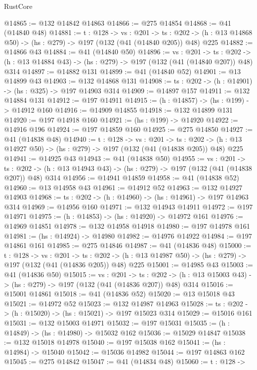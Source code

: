 \begin{lexlean}{RustCore}
\begin{coremodule}
@14865 := @132 @14842 @14863
@14866 := @275 @14854
@14868 := @41 (@14840 @48)
@14881 := {t : @128} ->
  {vs : @201} ->
  {ts : @202} -> (h : @13 @14868 @50) -> (hs : @279) -> @197 (@132 (@41 (@14840 @205)) @48) @225
@14882 := @14866 @43
@14884 := @41 (@14840 @50)
@14896 := {vs : @201} ->
  {ts : @202} -> (h : @13 @14884 @43) -> (hs : @279) -> @197 (@132 (@41 (@14840 @207)) @48) @314
@14897 := @14882 @131
@14899 := @41 (@14840 @52)
@14901 := @13 @14899 @43
@14903 := @132 @14868 @131
@14908 := {ts : @202} -> (h : @14901) -> (hs : @325) -> @197 @14903 @314
@14909 := @14897 @157
@14911 := @132 @14884 @131
@14912 := @197 @14911
@14915 := (h : @14857) -> (hs : @199) -> @14912 @160
@14916 := @14909 @14855
@14918 := @132 @14899 @131
@14920 := @197 @14918 @160
@14921 := (hs : @199) -> @14920
@14922 := @14916 @196
@14924 := @197 @14859 @160
@14925 := @275 @14850
@14927 := @41 (@14838 @48)
@14940 := {t : @128} ->
  {vs : @201} ->
  {ts : @202} -> (h : @13 @14927 @50) -> (hs : @279) -> @197 (@132 (@41 (@14838 @205)) @48) @225
@14941 := @14925 @43
@14943 := @41 (@14838 @50)
@14955 := {vs : @201} ->
  {ts : @202} -> (h : @13 @14943 @43) -> (hs : @279) -> @197 (@132 (@41 (@14838 @207)) @48) @314
@14956 := @14941 @14859
@14958 := @41 (@14838 @52)
@14960 := @13 @14958 @43
@14961 := @14912 @52
@14963 := @132 @14927 @14903
@14968 := {ts : @202} -> (h : @14960) -> (hs : @14961) -> @197 @14963 @314
@14969 := @14956 @160
@14971 := @132 @14943 @14911
@14972 := @197 @14971
@14975 := (h : @14853) -> (hs : @14920) -> @14972 @161
@14976 := @14969 @14851
@14978 := @132 @14958 @14918
@14980 := @197 @14978 @161
@14981 := (hs : @14924) -> @14980
@14982 := @14976 @14922
@14984 := @197 @14861 @161
@14985 := @275 @14846
@14987 := @41 (@14836 @48)
@15000 := {t : @128} ->
  {vs : @201} ->
  {ts : @202} -> (h : @13 @14987 @50) -> (hs : @279) -> @197 (@132 (@41 (@14836 @205)) @48) @225
@15001 := @14985 @43
@15003 := @41 (@14836 @50)
@15015 := {vs : @201} ->
  {ts : @202} -> (h : @13 @15003 @43) -> (hs : @279) -> @197 (@132 (@41 (@14836 @207)) @48) @314
@15016 := @15001 @14861
@15018 := @41 (@14836 @52)
@15020 := @13 @15018 @43
@15021 := @14972 @52
@15023 := @132 @14987 @14963
@15028 := {ts : @202} -> (h : @15020) -> (hs : @15021) -> @197 @15023 @314
@15029 := @15016 @161
@15031 := @132 @15003 @14971
@15032 := @197 @15031
@15035 := (h : @14849) -> (hs : @14980) -> @15032 @162
@15036 := @15029 @14847
@15038 := @132 @15018 @14978
@15040 := @197 @15038 @162
@15041 := (hs : @14984) -> @15040
@15042 := @15036 @14982
@15044 := @197 @14863 @162
@15045 := @275 @14842
@15047 := @41 (@14834 @48)
@15060 := {t : @128} ->

\end{coremodule}
\end{lexlean}
